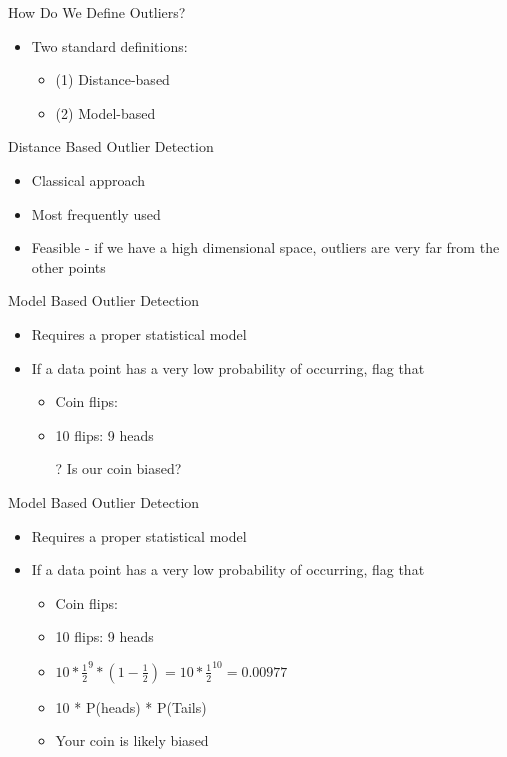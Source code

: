 \documentclass[aspectratio=169]{beamer}
\begin{document}
\begin{frame}{How Do We Define Outliers?}

\begin{itemize}
\item Two standard definitions:
        \begin{itemize}
	\item (1) Distance-based
	\item (2) Model-based
        \end{itemize}
\end{itemize}

\end{frame}
\begin{frame}{Distance Based Outlier Detection}

\begin{itemize}
\item Classical approach
\item Most frequently used
\item Feasible - if we have a high dimensional space, outliers are very far from the other points
\end{itemize}

\end{frame}
\begin{frame}{Model Based Outlier Detection}

\begin{itemize}
\item Requires a proper statistical model
\item If a data point has a very low probability of occurring, flag that
        \begin{itemize}
	\item Coin flips:
	\item 10 flips: 9 heads 
	\item[?] Is our coin biased?
        \end{itemize}
\end{itemize}
\end{frame}
\begin{frame}{Model Based Outlier Detection}

\begin{itemize}
\item Requires a proper statistical model
\item If a data point has a very low probability of occurring, flag that
        \begin{itemize}
	\item Coin flips:
	\item 10 flips: 9 heads 
	\vspace{1em}
	\item  $10 * \frac{1}{2}^9 * (1 -\frac{1}{2}) = 10 * \frac{1}{2}^{10} = 0.00977 $
	\item 10 * P(heads) * P(Tails)
	\item Your coin is likely biased
        \end{itemize}
\end{itemize}
\end{frame}
\end{document}
